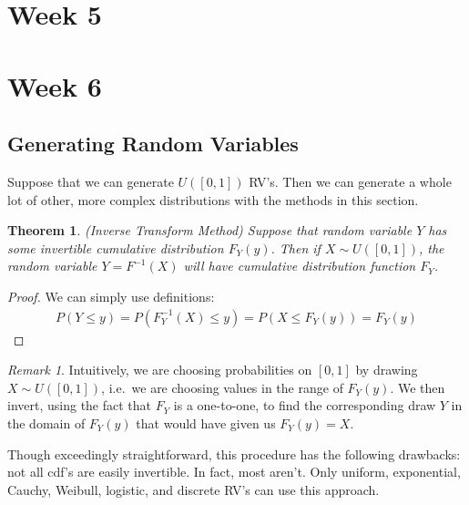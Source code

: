 \documentclass[12pt]{article}
\theoremstyle{plain}
\newtheorem{thm}{Theorem}[section]
\theoremstyle{definition}
\theoremstyle{remark}
\newtheorem*{rmk}{Remark}
\begin{document}
\section{Week 5}

\section{Week 6}

\subsection{Generating Random Variables}

Suppose that we can generate $U([0,1])$ RV's. Then we can generate a
whole lot of other, more complex distributions with the methods in this
section.

\begin{thm}\emph{(Inverse Transform Method)}
Suppose that random variable $Y$ has some invertible cumulative
distribution $F_Y(y)$. Then if $X\sim U([0,1])$, the random variable
$Y = F^{-1}(X)$ will have cumulative distribution function $F_Y$.
\end{thm}

\begin{proof}
We can simply use definitions:
\begin{align*}
  P(Y\leq y) = P(F_Y^{-1}(X) \leq y) = P(X \leq F_Y(y)) = F_Y(y)
\end{align*}
\end{proof}

\begin{rmk}
Intuitively, we are choosing probabilities on $[0,1]$ by drawing $X\sim
U([0,1])$, i.e.\ we are choosing values in the range of $F_Y(y)$. We
then invert, using the fact that $F_Y$ is a one-to-one, to find the
corresponding draw $Y$ in the domain of $F_Y(y)$ that would have given
us $F_Y(y) = X$.

Though exceedingly straightforward, this procedure has the following
drawbacks: not all cdf's are easily invertible. In fact, most aren't.
Only uniform, exponential, Cauchy, Weibull, logistic, and discrete RV's
can use this approach.
\end{rmk}
\end{document}
